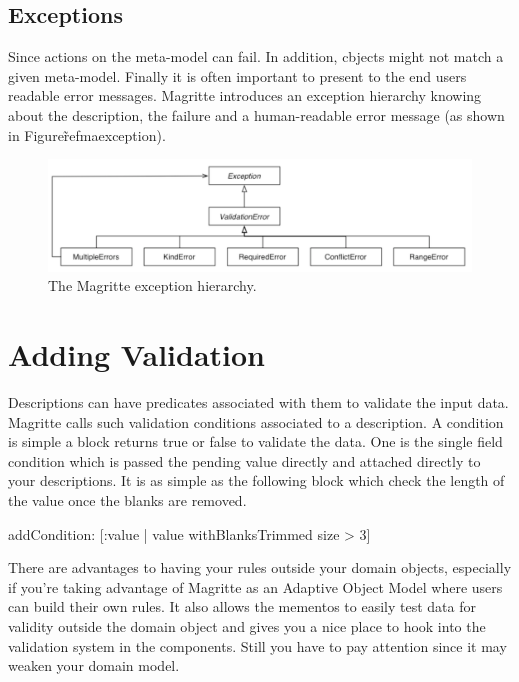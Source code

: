 \documentclass[a4paper,10pt,twoside]{book}
\begin{document}
\subsection{Exceptions}
Since actions on the meta-model can fail. In addition, cbjects might not match a given meta-model.
Finally it is often important to present to the end users readable error messages. Magritte introduces an exception hierarchy knowing about the description, the failure and a human-readable error message (as shown in Figure\~ref{maexception}).

\begin{figure}[!h]
	\begin{center}
\includegraphics[width=\linewidth]{exceptions}
\caption{The Magritte exception hierarchy. \label{maexception}}
\end{center}
\end{figure}



\section{Adding Validation}

Descriptions can have predicates associated with them to validate the input data. Magritte calls such validation conditions associated to a description. A condition is simple a block returns true or false to validate the data. One is the single field condition which is passed the pending value directly and attached directly to your descriptions. It is as simple as the following block which check the length of the value once the blanks are removed.

\begin{code}{}
addCondition: [:value | value withBlanksTrimmed size > 3] 
\end{code}

There are advantages to having your rules outside your domain objects, especially if you're taking advantage of Magritte as an Adaptive Object Model where users can build their own rules. 
It also allows the mementos to easily test data for validity outside the domain object and gives you a nice place to hook into the validation system in the  components. Still you have to pay attention since it may weaken your domain model. 
\end{document}
